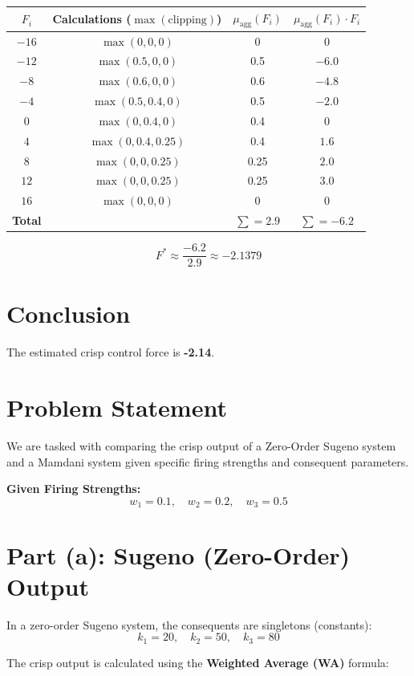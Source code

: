 \documentclass{article}
\begin{document}
\begin{center}
\begin{tabular}{|c|c|c|c|}
\hline
$F_i$ & Calculations ($\max(\text{clipping})$) & $\mu_{\text{agg}}(F_i)$ & $\mu_{\text{agg}}(F_i) \cdot F_i$ \\
\hline
$-16$ & $\max(0, 0, 0)$ & 0 & 0 \\
$-12$ & $\max(0.5, 0, 0)$ & 0.5 & $-6.0$ \\
$-8$ & $\max(0.6, 0, 0)$ & 0.6 & $-4.8$ \\
$-4$ & $\max(0.5, 0.4, 0)$ & 0.5 & $-2.0$ \\
$0$ & $\max(0, 0.4, 0)$ & 0.4 & 0 \\
$4$ & $\max(0, 0.4, 0.25)$ & 0.4 & $1.6$ \\
$8$ & $\max(0, 0, 0.25)$ & 0.25 & $2.0$ \\
$12$ & $\max(0, 0, 0.25)$ & 0.25 & $3.0$ \\
$16$ & $\max(0, 0, 0)$ & 0 & 0 \\
\hline
\textbf{Total} & & $\sum = 2.9$ & $\sum = -6.2$ \\
\hline
\end{tabular}
\end{center}

\[ F^* \approx \frac{-6.2}{2.9} \approx -2.1379 \]

\section{Conclusion}
The estimated crisp control force is \textbf{-2.14}.

\section{Problem Statement}
We are tasked with comparing the crisp output of a Zero-Order Sugeno system and a Mamdani system given specific firing strengths and consequent parameters.

\textbf{Given Firing Strengths:}
\[ w_1 = 0.1, \quad w_2 = 0.2, \quad w_3 = 0.5 \]

\section{Part (a): Sugeno (Zero-Order) Output}
In a zero-order Sugeno system, the consequents are singletons (constants):
\[ k_1 = 20, \quad k_2 = 50, \quad k_3 = 80 \]

The crisp output is calculated using the \textbf{Weighted Average (WA)} formula:
\end{document}
